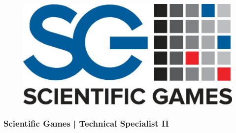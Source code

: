 \documentclass[letter,10pt]{article}
\begin{document}
\begin{itemize}
\begin{figure}
\includegraphics[width=0.8\linewidth]{./img/50p_cr_scientific_games.jpg}
\end{figure}
\end{itemize}

\subsubsection*{Scientific Games | Technical Specialist II}
\label{sec:org140c2d5}
\end{document}
